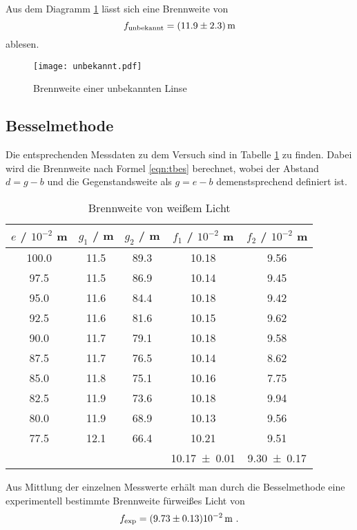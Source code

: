 Aus dem Diagramm \ref{fig:fiunb} lässt sich eine Brennweite von 
\begin{equation}
  f_\text{unbekannt} = (\num{11.9 +- 2.3}) \, \text{m}
  \label{eqn:unb}
\end{equation}
ablesen.
\begin{figure}
  \centering
  \texttt{[image: unbekannt.pdf]}
  \caption{Brennweite einer unbekannten Linse}
  \label{fig:fiunb}
\end{figure}
\subsection{Besselmethode}
Die entsprechenden Messdaten zu dem Versuch sind in Tabelle \ref{tab:ffw} zu finden.  Dabei wird die Brennweite nach Formel \eqref{eqn:tbes} berechnet, wobei der Abstand $d = g - b$ und die Gegenstandsweite als $g = e - b$ demenstsprechend definiert ist.
\begin{table}
  \centering
  \begin{tabular}{c c c | c c}
    \toprule
    $e$ / $10^{-2}$ m & $g_1$ / m & $g_2$ / m & $f_1$ / $10^{-2}$ m & $f_2$ / $10^{-2}$ m\\
    \midrule
	100.0	& 11.5	& 89.3	& 10.18	& 9.56	\\
	97.5	& 11.5	& 86.9	& 10.14	& 9.45	\\
	95.0	& 11.6	& 84.4	& 10.18	& 9.42	\\
	92.5	& 11.6	& 81.6	& 10.15	& 9.62	\\
	90.0	& 11.7	& 79.1	& 10.18	& 9.58	\\
	87.5	& 11.7	& 76.5	& 10.14	& 8.62	\\	
	85.0	& 11.8	& 75.1	& 10.16	& 7.75	\\	
	82.5	& 11.9	& 73.6	& 10.18	& 9.94	\\
	80.0	& 11.9	& 68.9	& 10.13	& 9.56	\\
	77.5	& 12.1	& 66.4	& 10.21	& 9.51	\\
   \midrule
		&	&	& \num{10.17 +- 0.01} & \num{9.30 +- 0.17} \\
   \bottomrule
  \end{tabular}
  	\caption{Brennweite von weißem Licht}
  \label{tab:ffw}
\end{table}
Aus Mittlung der einzelnen Messwerte erhält man durch die Besselmethode eine experimentell bestimmte Brennweite fürweißes Licht von 
\begin{equation}
  f_\text{exp} = (\num{9.73 +- 0.13}) 10^{-2} \, \text{m} \ .
  \label{eqn:fexp}
\end{equation}
